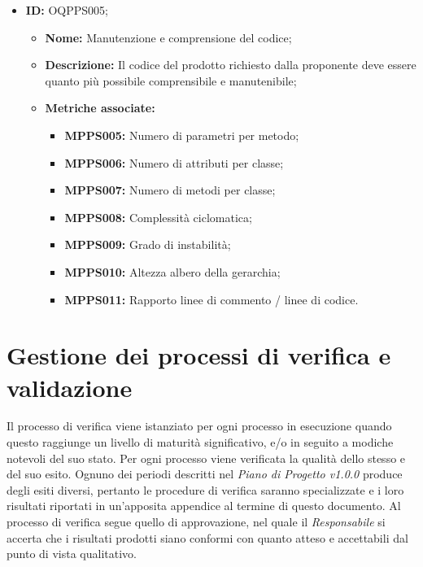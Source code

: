 \documentclass[openany,12pt,a4paper]{report}
\begin{document}
        \begin{itemize}
            \item \textbf{ID:} OQPPS005;
            \begin{itemize} 
            	\item \textbf{Nome:} Manutenzione e comprensione del codice;
            	\item \textbf{Descrizione:} Il codice del prodotto richiesto dalla proponente deve essere quanto più possibile comprensibile e manutenibile;
            	\item \textbf{Metriche associate:} 
                \begin{itemize}
                    \item \textbf{MPPS005:} Numero di parametri per metodo;
                    \item \textbf{MPPS006:} Numero di attributi per classe;
                    \item \textbf{MPPS007:} Numero di metodi per classe;
                    \item \textbf{MPPS008:} Complessità ciclomatica;
                    \item \textbf{MPPS009:} Grado di instabilità;
                    \item \textbf{MPPS010:} Altezza albero della gerarchia;
                    \item \textbf{MPPS011:} Rapporto linee di commento / linee di codice.
                \end{itemize}
            \end{itemize}
        \end{itemize}

    \section{Gestione dei processi di verifica e validazione}
        
    Il processo di verifica viene istanziato per ogni processo in esecuzione quando questo raggiunge un livello di maturità significativo, e/o in seguito a modiche notevoli del suo stato. Per ogni processo viene verificata la qualità dello stesso e del suo esito. 
    Ognuno dei periodi descritti nel \textit{Piano di Progetto v1.0.0} produce degli esiti diversi, pertanto le procedure di verifica saranno specializzate e i loro risultati riportati in un'apposita appendice al termine di questo documento. 
    Al processo di verifica segue quello di approvazione, nel quale il \textit{Responsabile} si accerta che i risultati prodotti siano conformi con quanto atteso e accettabili dal punto di vista qualitativo.
\end{document}
